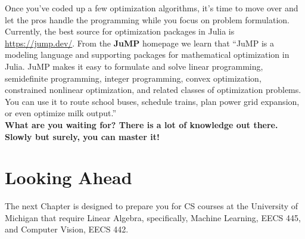 Once you've coded up a few optimization algorithms, it's time to move over and let the pros handle the programming while you focus on problem formulation. Currently, the best source for optimization packages in Julia is \url{https://jump.dev/}. From the \textbf{JuMP} homepage we learn that ``JuMP is a modeling language and supporting packages for mathematical optimization in Julia. JuMP makes it easy to formulate and solve linear programming, semidefinite programming, integer programming, convex optimization, constrained nonlinear optimization, and related classes of optimization problems. You can use it to route school buses, schedule trains, plan power grid expansion, or even optimize milk output.''\\

\textbf{What are you waiting for? There is a lot of knowledge out there. Slowly but surely, you can master it!}

\section{Looking Ahead}

The next Chapter is designed to prepare you for CS courses at the University of Michigan that require Linear Algebra, specifically, Machine Learning, EECS 445, and Computer Vision, EECS 442.  